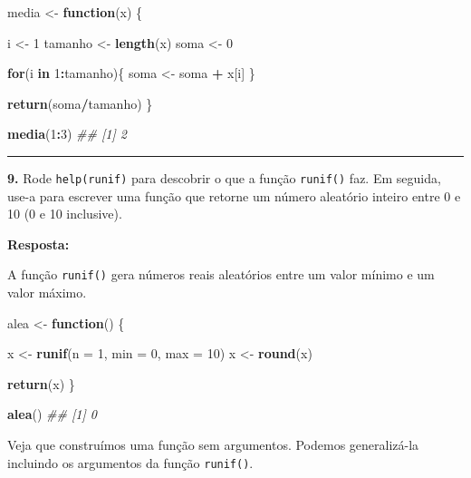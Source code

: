 \documentclass[]{book}
\newenvironment{Shaded}{\begin{snugshade}}{\end{snugshade}}
\newcommand{\CommentTok}[1]{\textcolor[rgb]{0.56,0.35,0.01}{\textit{#1}}}
\newcommand{\ControlFlowTok}[1]{\textcolor[rgb]{0.13,0.29,0.53}{\textbf{#1}}}
\newcommand{\DataTypeTok}[1]{\textcolor[rgb]{0.13,0.29,0.53}{#1}}
\newcommand{\DecValTok}[1]{\textcolor[rgb]{0.00,0.00,0.81}{#1}}
\newcommand{\KeywordTok}[1]{\textcolor[rgb]{0.13,0.29,0.53}{\textbf{#1}}}
\newcommand{\NormalTok}[1]{#1}
\newcommand{\OperatorTok}[1]{\textcolor[rgb]{0.81,0.36,0.00}{\textbf{#1}}}
\newcommand{\StringTok}[1]{\textcolor[rgb]{0.31,0.60,0.02}{#1}}
\begin{document}
\begin{Shaded}
\begin{Highlighting}[]
\NormalTok{media <-}\StringTok{ }\ControlFlowTok{function}\NormalTok{(x) \{}
  
\NormalTok{  i <-}\StringTok{ }\DecValTok{1}
\NormalTok{  tamanho <-}\StringTok{ }\KeywordTok{length}\NormalTok{(x)}
\NormalTok{  soma <-}\StringTok{ }\DecValTok{0}
  
  \ControlFlowTok{for}\NormalTok{(i }\ControlFlowTok{in} \DecValTok{1}\OperatorTok{:}\NormalTok{tamanho)\{}
\NormalTok{    soma <-}\StringTok{ }\NormalTok{soma }\OperatorTok{+}\StringTok{ }\NormalTok{x[i]}
\NormalTok{  \}}
  
  \KeywordTok{return}\NormalTok{(soma}\OperatorTok{/}\NormalTok{tamanho)}
\NormalTok{\}}

\KeywordTok{media}\NormalTok{(}\DecValTok{1}\OperatorTok{:}\DecValTok{3}\NormalTok{)}
\CommentTok{## [1] 2}
\end{Highlighting}
\end{Shaded}

\begin{center}\rule{0.5\linewidth}{\linethickness}\end{center}

\textbf{9.} Rode \texttt{help(runif)} para descobrir o que a função \texttt{runif()} faz. Em seguida, use-a para escrever uma função que retorne um número aleatório inteiro entre 0 e 10 (0 e 10 inclusive).

\textbf{Resposta:}

A função \texttt{runif()} gera números reais aleatórios entre um valor mínimo e um valor máximo.

\begin{Shaded}
\begin{Highlighting}[]
\NormalTok{alea <-}\StringTok{ }\ControlFlowTok{function}\NormalTok{() \{}
  
\NormalTok{  x <-}\StringTok{ }\KeywordTok{runif}\NormalTok{(}\DataTypeTok{n =} \DecValTok{1}\NormalTok{, }\DataTypeTok{min =} \DecValTok{0}\NormalTok{, }\DataTypeTok{max =} \DecValTok{10}\NormalTok{)}
\NormalTok{  x <-}\StringTok{ }\KeywordTok{round}\NormalTok{(x)}
  
  \KeywordTok{return}\NormalTok{(x)}
\NormalTok{\}}

\KeywordTok{alea}\NormalTok{()}
\CommentTok{## [1] 0}
\end{Highlighting}
\end{Shaded}

Veja que construímos uma função sem argumentos. Podemos generalizá-la incluindo os argumentos da função \texttt{runif()}.
\end{document}

